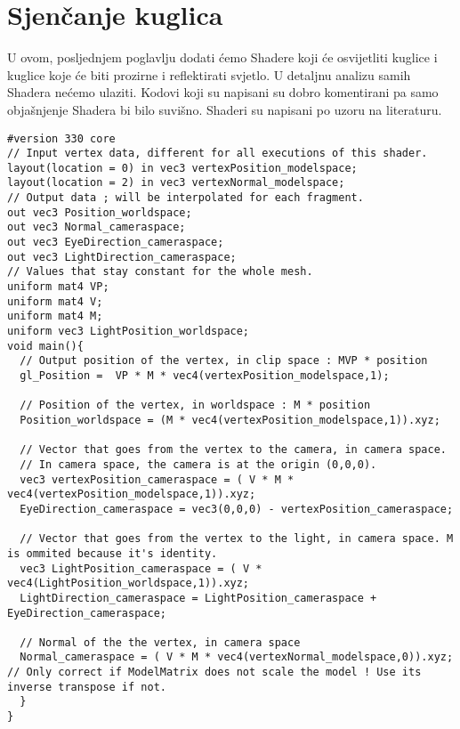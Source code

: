 \section{Sjenčanje kuglica}
U ovom, posljednjem poglavlju dodati ćemo Shadere koji će osvijetliti kuglice i kuglice koje će biti prozirne i reflektirati svjetlo. U detaljnu analizu samih Shadera nećemo ulaziti. Kodovi koji su napisani su dobro komentirani pa samo objašnjenje Shadera bi bilo suvišno. Shaderi su napisani po uzoru na literaturu\cite{15}. \newpage
\begin{lstlisting}[style = myC++ , label = {code:21}, caption = {Konačni Shader točaka}]
#version 330 core
// Input vertex data, different for all executions of this shader.
layout(location = 0) in vec3 vertexPosition_modelspace;
layout(location = 2) in vec3 vertexNormal_modelspace;
// Output data ; will be interpolated for each fragment.
out vec3 Position_worldspace;
out vec3 Normal_cameraspace;
out vec3 EyeDirection_cameraspace;
out vec3 LightDirection_cameraspace;
// Values that stay constant for the whole mesh.
uniform mat4 VP;
uniform mat4 V;
uniform mat4 M;
uniform vec3 LightPosition_worldspace;
void main(){
  // Output position of the vertex, in clip space : MVP * position
  gl_Position =  VP * M * vec4(vertexPosition_modelspace,1);

  // Position of the vertex, in worldspace : M * position
  Position_worldspace = (M * vec4(vertexPosition_modelspace,1)).xyz;

  // Vector that goes from the vertex to the camera, in camera space.
  // In camera space, the camera is at the origin (0,0,0).
  vec3 vertexPosition_cameraspace = ( V * M * vec4(vertexPosition_modelspace,1)).xyz;
  EyeDirection_cameraspace = vec3(0,0,0) - vertexPosition_cameraspace;

  // Vector that goes from the vertex to the light, in camera space. M is ommited because it's identity.
  vec3 LightPosition_cameraspace = ( V * vec4(LightPosition_worldspace,1)).xyz;
  LightDirection_cameraspace = LightPosition_cameraspace + EyeDirection_cameraspace;

  // Normal of the the vertex, in camera space
  Normal_cameraspace = ( V * M * vec4(vertexNormal_modelspace,0)).xyz; // Only correct if ModelMatrix does not scale the model ! Use its inverse transpose if not.
  }
}
\end{lstlisting}

